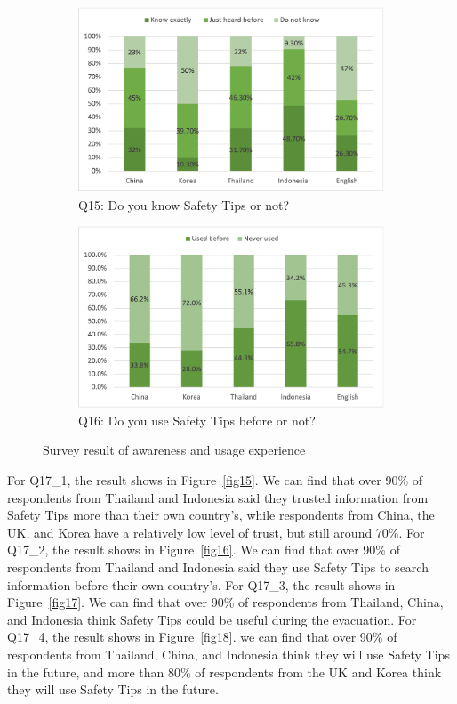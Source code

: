 \begin{figure}[h]
  \begin{subfigure}{0.4\textwidth}
  \includegraphics[width=\linewidth]{Figure/Figure13.png}
  \centering
  \caption{Q15: Do you know Safety Tips or not?}
  \label{fig13}
  \end{subfigure}\hfill
  \begin{subfigure}{0.4\textwidth}
  \includegraphics[width=\linewidth]{Figure/Figure14.png}
  \centering
  \caption{Q16: Do you use Safety Tips before or not?}
  \label{fig14}
  \end{subfigure}
  \caption{Survey result of awareness and usage experience}
\end{figure}

\cleardoublepage
For Q17\_1, the result shows in Figure~\ref{fig15}. We can find that over 90\% of respondents from Thailand and Indonesia said they trusted information from Safety Tips more than their own country's, while respondents from China, the UK, and Korea have a relatively low level of trust, but still around 70\%. For Q17\_2, the result shows in Figure~\ref{fig16}. We can find that over 90\% of respondents from Thailand and Indonesia said they use Safety Tips to search information before their own country's. For Q17\_3, the result shows in Figure~\ref{fig17}. We can find that over 90\% of respondents from Thailand, China, and Indonesia think Safety Tips could be useful during the evacuation. For Q17\_4, the result shows in Figure~\ref{fig18}. we can find that over 90\% of respondents from Thailand, China, and Indonesia think they will use Safety Tips in the future, and more than 80\% of respondents from the UK and Korea think they will use Safety Tips in the future.


